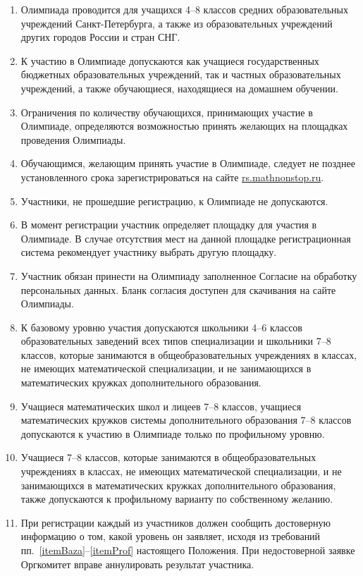 \documentclass[a4paper,12pt]{article}
\newcommand{\surl}[1]{{\small\url{#1}}}
\begin{document}
\begin{enumerate}
	\item Олимпиада проводится для учащихся 4–8 классов средних образовательных учреждений Санкт-Петербурга, а также из образовательных учреждений других городов России и стран СНГ.
	\item К участию в Олимпиаде допускаются как учащиеся государственных бюджетных образовательных учреждений, так и частных образовательных учреждений, а также обучающиеся, находящиеся на домашнем обучении.
	\item Ограничения по количеству обучающихся, принимающих участие в Олимпиаде, определяются возможностью принять желающих на площадках проведения Олимпиады.
	\item Обучающимся, желающим принять участие в Олимпиаде, следует не позднее установленного срока зарегистрироваться на сайте \surl{rs.mathnonstop.ru}.
	\item Участники, не прошедшие регистрацию, к Олимпиаде не допускаются.
	\item В момент регистрации участник определяет площадку для участия в Олимпиаде. В случае отсутствия мест на данной площадке регистрационная система рекомендует участнику выбрать другую площадку.
	\item Участник обязан принести на Олимпиаду заполненное Согласие на обработку персональных данных. Бланк согласия доступен для скачивания на сайте Олимпиады.
	\item \label{itemBaza}
	   К базовому уровню участия допускаются школьники 4–6 классов
	   образовательных заведений всех типов специализации и
	   школьники 7–8 классов, которые занимаются в общеобразовательных
	   учреждениях в классах, не имеющих математической специализации,
	   и не занимающихся в математических кружках дополнительного образования.
	\item Учащиеся математических школ и лицеев 7–8 классов,
	   учащиеся математических кружков системы дополнительного образования
	   7–8 классов допускаются к участию в Олимпиаде
	   только по профильному уровню.
	\item \label{itemProf}
	   Учащиеся 7–8 классов, которые занимаются в общеобразовательных
	   учреждениях в классах, не имеющих математической специализации,
	   и не занимающихся в математических кружках дополнительного образования,
	   также допускаются к профильному варианту по собственному желанию.
	\item При регистрации каждый из участников должен сообщить
	   достоверную информацию о том, какой уровень он заявляет, исходя из
	   требований пп.~\ref{itemBaza}–\ref{itemProf} настоящего Положения.
	   При недостоверной заявке Оргкомитет вправе аннулировать
	   результат участника.
\end{enumerate}
\end{document}
